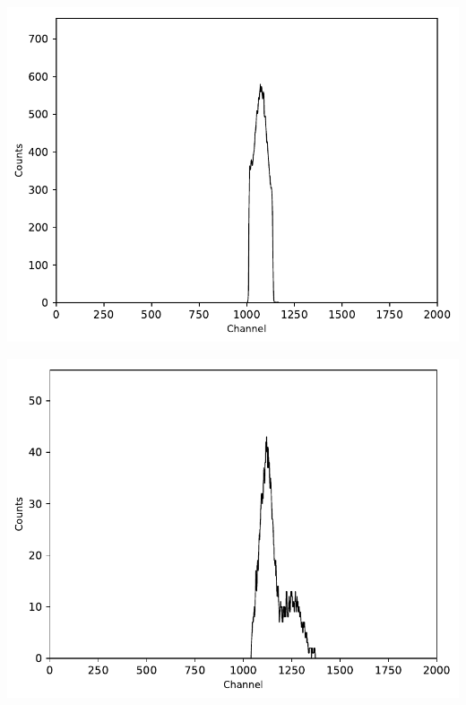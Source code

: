 \begin{multicols}{2}
\begin{center}
\begin{adjustbox}{max width=\linewidth, keepaspectratio}
        \end{adjustbox}
        \label{fig:60CoZeitspektrum60ns}
    \end{center}
\endminipage
%
\vspace{10mm}
%
\minipage{\linewidth}
    \begin{center}
        \captionsetup{type=figure}
        \begin{adjustbox}{max width=\linewidth, keepaspectratio}
            \includegraphics[]{pdf/60CoEnergiewindow2-peak2}
        \end{adjustbox}
        \label{fig:60CoEnergiewindow2-peak2}
    \end{center}
\endminipage
%
\vspace{10mm}
%
\minipage{\linewidth}
    \begin{center}
        \captionsetup{type=figure}
        \begin{adjustbox}{max width=\linewidth, keepaspectratio}
            \includegraphics[]{pdf/60CoKaskadenEnergiewindowBeiPeak2}

\end{adjustbox}
\end{center}
\end{multicols}
